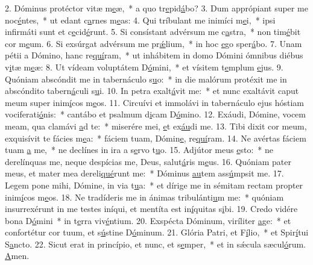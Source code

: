 2. Dóminus protéctor vitæ m\uline{e}æ,~* a quo tr\uline{e}pid\uline{á}bo?
3. Dum apprópiant super me noc\uline{é}ntes,~* ut edant c\uline{a}rnes m\uline{e}as:
4. Qui tríbulant me inimíci m\uline{e}i,~* ipsi infirmáti sunt et c\uline{e}cid\uline{é}runt.
5. Si consístant advérsum me c\uline{a}stra,~* non tim\uline{é}bit cor m\uline{e}um.
6. Si exsúrgat advérsum me pr\uline{ǽ}lium,~* in hoc \uline{e}go sper\uline{á}bo.
7. Unam pétii a Dómino, hanc re\uline{quí}ram,~* ut inhábitem in domo Dómini ómnibus diébus v\uline{i}tæ m\uline{e}æ:
8. Ut vídeam voluptátem D\uline{ó}mini,~* et vísitem t\uline{e}mplum \uline{e}jus.
9. Quóniam abscóndit me in tabernáculo s\uline{u}o:~* in die malórum protéxit me in abscóndito tabern\uline{á}culi s\uline{u}i.
10. In petra exalt\uline{á}vit me:~* et nunc exaltávit caput meum super inim\uline{í}cos m\uline{e}os.
11. Circuívi et immolávi in tabernáculo ejus hóstiam vociferati\uline{ó}nis:~* cantábo et psalmum d\uline{i}cam D\uline{ó}mino.
12. Exáudi, Dómine, vocem meam, qua clamávi \uline{a}d te:~* miserére mei, \uline{e}t ex\uline{áu}di me.
13. Tibi dixit cor meum, exquisívit te fácies m\uline{e}a:~* fáciem tuam, Dómin\uline{e}, re\uline{quí}ram.
14. Ne avértas fáciem tuam \uline{a} me,~* ne declínes in ira a s\uline{e}rvo t\uline{u}o.
15. Adjútor meus \uline{e}sto:~* ne derelínquas me, neque despícias me, Deus, salut\uline{á}ris m\uline{e}us.
16. Quóniam pater meus, et mater mea dereli\uline{qué}runt me:~* Dóminus \uline{au}tem ass\uline{ú}mpsit me.
17. Legem pone mihi, Dómine, in via t\uline{u}a:~* et dírige me in sémitam rectam propter inim\uline{í}cos m\uline{e}os.
18. Ne tradíderis me in ánimas tribulánti\uline{u}m me:~* quóniam insurrexérunt in me testes iníqui, et mentíta est in\uline{í}quitas s\uline{i}bi.
19. Credo vidére bona D\uline{ó}mini~* in t\uline{e}rra viv\uline{é}ntium.
20. Exspécta Dóminum, viríliter \uline{a}ge:~* et confortétur cor tuum, et s\uline{ú}stine D\uline{ó}minum.
21. Glória Patri, et F\uline{í}lio,~* et Spir\uline{í}tui S\uline{a}ncto.
22. Sicut erat in princípio, et nunc, et s\uline{e}mper,~* et in sǽcula sæcul\uline{ó}rum. \uline{A}men.
